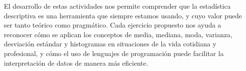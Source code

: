 \documentclass[12pt]{article}
\begin{document}
El desarrollo de estas actividades nos permite comprender que la estadística descriptiva es una herramienta que siempre estamos usando, y cuyo valor puede ser tanto teórico como pragmático. Cada ejercicio propuesto nos ayuda a reconocer cómo se aplican los conceptos de media, mediana, moda, varianza, desviación estándar y histogramas en situaciones de la vida cotidiana y profesional, y cómo el uso de lenguajes de programación puede facilitar la interpretación de datos de manera más eficiente.

\newpage


\nocite{*}
\printbibliography[heading=bibintoc]
\newpage
\end{document}
